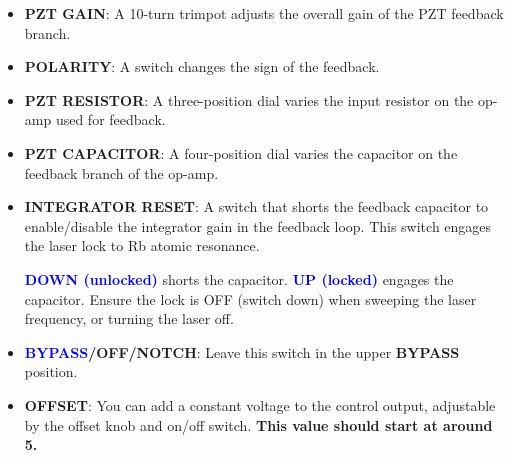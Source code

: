 \documentclass{../lab}
\begin{document}
\begin{itemize}
    \item \textbf{PZT GAIN}: A 10-turn trimpot adjusts the overall gain of the PZT feedback branch.

    \item \textbf{POLARITY}: A switch changes the sign of the feedback. 

    \item \textbf{PZT RESISTOR}: A three-position dial varies the input resistor on the op-amp used for feedback.

    \item \textbf{PZT CAPACITOR}: A four-position dial varies the capacitor on the feedback branch of the op-amp.

    \item \textbf{INTEGRATOR RESET}: A switch that shorts the feedback capacitor to enable/disable the integrator gain in the feedback loop. This switch engages the laser lock to Rb atomic resonance. 
    
    \textcolor{blue}{\textbf{DOWN (unlocked)}} shorts the capacitor. \textcolor{blue}{\textbf{UP (locked)}} engages the capacitor. Ensure the lock is OFF (switch down) when sweeping the laser frequency, or turning the laser off.

    \item \textbf{\textcolor{blue}{BYPASS}/OFF/NOTCH}: Leave this switch in the upper \textbf{BYPASS} position.

    \item \textbf{OFFSET}: You can add a constant voltage to the control output, adjustable by the offset knob and on/off switch. \textbf{This value should start at around 5.}
\end{itemize}

\end{document}

